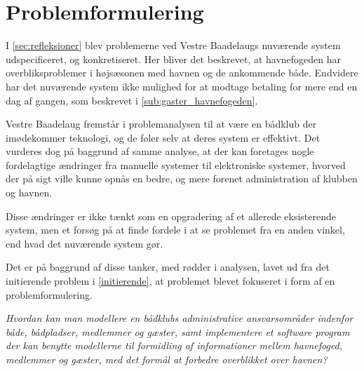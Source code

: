 \chapter{Problemformulering}
\label{cha:problemformulering}

I \cref{sec:refleksioner} blev problemerne ved Vestre Baadelaugs nuværende system udspecificeret, og konkretiseret. Her bliver det beskrevet, at havnefogeden har overbliksproblemer i højsæsonen med havnen og de ankommende både. Endvidere har det nuværende system ikke mulighed for at modtage betaling for mere end en dag af gangen, som beskrevet i \cref{sub:gaster_havnefogeden}. 

Vestre Baadelaug fremstår i problemanalysen til at være en bådklub der imødekommer teknologi, og de føler selv at deres system er effektivt. Det vurderes dog på baggrund af samme analyse, at der kan foretages nogle fordelagtige ændringer fra manuelle systemer til elektroniske systemer, hvorved der på sigt ville kunne opnås en bedre, og mere forenet administration af klubben og havnen.

Disse ændringer er ikke tænkt som en opgradering af et allerede eksisterende system, men et forsøg på at finde fordele i at se problemet fra en anden vinkel, end hvad det nuværende system gør.

Det er på baggrund af disse tanker, med rødder i analysen, lavet ud fra det initierende problem i \cref{initierende}, at problemet blevet fokuseret i form af en problemformulering. 

\begin{displayquote}
\textit{Hvordan kan man modellere en bådklubs administrative ansvarsområder indenfor både, bådpladser, medlemmer og gæster, samt implementere et software program der kan benytte modellerne til formidling af informationer mellem havnefoged, medlemmer og gæster, med det formål at forbedre overblikket over havnen?}
\end{displayquote}


